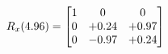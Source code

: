 \documentclass[preview]{standalone}
\begin{document}
\begin{align*}
\special{dvisvgm:raw <g id='unique000'>}R_{x}(4.96) = \begin{bmatrix}1 & 0 & 0 \\0 & +0.24 & +0.97 \\0 & -0.97 & +0.24\end{bmatrix}\special{dvisvgm:raw </g>}
\end{align*}
\end{document}
